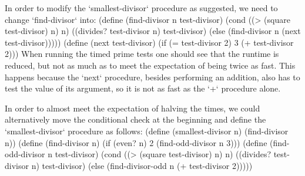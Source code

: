 In order to modify the `smallest-divisor` procedure as suggested, we need to change `find-divisor` into:
\begtt\scm
(define (find-divisor n test-divisor)
  (cond ((> (square test-divisor) n) n)
        ((divides? test-divisor n) test-divisor)
        (else (find-divisor n (next test-divisor)))))
(define (next test-divisor)
  (if (= test-divisor 2)
      3
      (+ test-divisor 2)))
\endtt
When running the timed prime tests one should see that the runtime is reduced, but not as much as to meet the expectation of being twice as fast.  This happens because the `next` procedure, besides performing an addition, also has to test the value of its argument, so it is not as fast as the `+` procedure alone. 

In order to almost meet the expectation of halving the times, we could alternatively move the conditional check at the beginning and define the `smallest-divisor` procedure as follows:
\begtt\scm
(define (smallest-divisor n) (find-divisor n))
(define (find-divisor n)
  (if (even? n) 2 (find-odd-divisor n 3)))
(define (find-odd-divisor n test-divisor)
  (cond ((> (square test-divisor) n) n)
        ((divides? test-divisor n) test-divisor)
        (else (find-divisor-odd n (+ test-divisor 2)))))
\endtt

